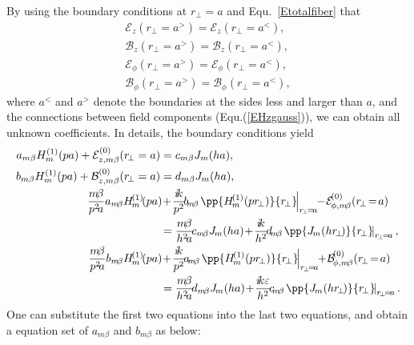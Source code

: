 \documentclass[]{report}
\begin{document}
By using the boundary conditions at $ r\!_\perp=a $ and Equ.~\ref{Etotalfiber} that
\begin{align}
\mathcal{E}_{z}(r\!_\perp =a^> ) = \mathcal{E}_{z}(r\!_\perp =a^< ),\\
\mathcal{B}_{z}(r\!_\perp =a^> ) = \mathcal{B}_{z}(r\!_\perp =a^< ),\\
\mathcal{E}_{\phi}(r\!_\perp =a^> ) = \mathcal{E}_{\phi}(r\!_\perp =a^< ),\\
\mathcal{B}_{\phi}(r\!_\perp =a^> ) = \mathcal{B}_{\phi}(r\!_\perp =a^< ),
\end{align}
where $ a^< $ and $ a^> $ denote the boundaries at the sides less and larger than $ a $, and the connections between field components (Equ.(\ref{EHzgauss})), we can obtain all unknown coefficients. In details, the boundary conditions yield
\begin{align}
a_{m\beta}H_m^{(1)}(pa)+\mathcal{E}_{z,m\beta}^{(0)}(r\!_\perp =a ) &= c_{m\beta}J_m(ha),\\
b_{m\beta}H_m^{(1)}(pa)+\mathcal{B}_{z,m\beta}^{(0)}(r\!_\perp =a ) &= d_{m\beta}J_m(ha),\\
\frac{m\! \beta}{p^2\! a}a_{m\!\beta} H\!_m^{(1)}\!(pa)\! &+\! \frac{i\!k}{p^2}\! b\!_{m\!\beta}\! \left. \pp{H\!_m^{( 1 )}(p r\!_\perp)}{r\!_\perp}\! \right|_{r\!_\perp\! =\! a}\!\! -\! \mathcal{E}\! _{\phi,m\! \beta}^{(0)}(r\!_\perp\! =\! a ) \nonumber \\
&= \frac{m\! \beta}{h^2\! a}\! c_{m\! \beta} J\!_m(ha)\! +\! \frac{i\!k}{h^2}\!d\!_{m\!\beta} \! \left. \pp{J\!_m(h r\!_\perp \!)}{r\!_\perp}\! \right|_{r\!_\perp\! =\! a},\\
\frac{m\! \beta}{p^2\! a}b_{m\!\beta} H\!_m^{(1)}\!(pa)\! &+\! \frac{i\!k}{p^2}\! a\!_{m\!\beta}\! \left. \pp{H\!_m^{( 1 )}(p r\!_\perp)}{r\!_\perp}\! \right|_{r\!_\perp\! =\! a}\!\! +\! \mathcal{B}\! _{\phi,m\! \beta}^{(0)}(r\!_\perp\! =\! a ) \nonumber \\
&= \frac{m\! \beta}{h^2\! a}\! d_{m\! \beta} J\!_m(ha)\! +\! \frac{i\!k\varepsilon}{h^2}\!c\!_{m\!\beta} \! \left. \pp{J\!_m(h r\!_\perp \!)}{r\!_\perp}\! \right|_{r\!_\perp\! =\! a}.
\end{align}
One can substitute the first two equations into the last two equations, and obtain a equation set of $a_{m\beta}$ and $b_{m\beta}$ as below:
\end{document}
